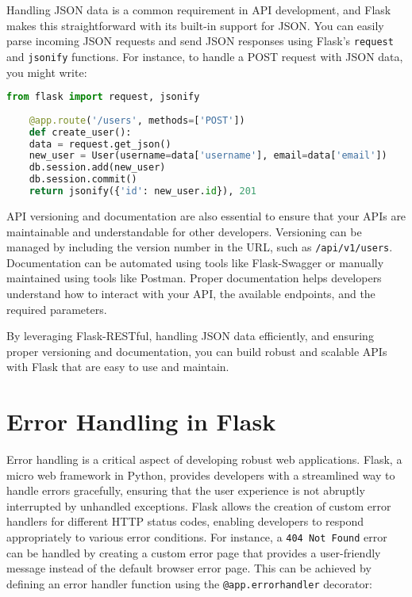 Handling JSON data is a common requirement in API development, and Flask makes this straightforward with its built-in support for JSON. You can easily parse incoming JSON requests and send JSON responses using Flask's \texttt{request} and \texttt{jsonify} functions. For instance, to handle a POST request with JSON data, you might write:

\begin{lstlisting}[language=Python]
	from flask import request, jsonify
	
	@app.route('/users', methods=['POST'])
	def create_user():
	data = request.get_json()
	new_user = User(username=data['username'], email=data['email'])
	db.session.add(new_user)
	db.session.commit()
	return jsonify({'id': new_user.id}), 201
\end{lstlisting}

API versioning and documentation are also essential to ensure that your APIs are maintainable and understandable for other developers. Versioning can be managed by including the version number in the URL, such as \texttt{/api/v1/users}. Documentation can be automated using tools like Flask-Swagger or manually maintained using tools like Postman. Proper documentation helps developers understand how to interact with your API, the available endpoints, and the required parameters.

By leveraging Flask-RESTful, handling JSON data efficiently, and ensuring proper versioning and documentation, you can build robust and scalable APIs with Flask that are easy to use and maintain.\cite{flaskrestfuldocumentation:2024}

\section{Error Handling in Flask}

Error handling is a critical aspect of developing robust web applications. Flask, a micro web framework in Python, provides developers with a streamlined way to handle errors gracefully, ensuring that the user experience is not abruptly interrupted by unhandled exceptions. Flask allows the creation of custom error handlers for different HTTP status codes, enabling developers to respond appropriately to various error conditions. For instance, a \texttt{404 Not Found} error can be handled by creating a custom error page that provides a user-friendly message instead of the default browser error page. This can be achieved by defining an error handler function using the \texttt{@app.errorhandler} decorator:\cite{Grinberg:2018}

